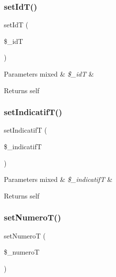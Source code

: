 \subsubsection{\texorpdfstring{set\+Id\+T()}{setIdT()}}
{\footnotesize\ttfamily set\+IdT (\begin{DoxyParamCaption}\item[{}]{\$\+\_\+idT }\end{DoxyParamCaption})}


\begin{DoxyParams}[1]{Parameters}
mixed & {\em \$\+\_\+idT} & \\
\hline
\end{DoxyParams}
\begin{DoxyReturn}{Returns}
self 
\end{DoxyReturn}
\mbox{\label{class_telephone_ab6bf8385aab0e358abde5765c80a934f}} 
\subsubsection{\texorpdfstring{set\+Indicatif\+T()}{setIndicatifT()}}
{\footnotesize\ttfamily set\+IndicatifT (\begin{DoxyParamCaption}\item[{}]{\$\+\_\+indicatifT }\end{DoxyParamCaption})}


\begin{DoxyParams}[1]{Parameters}
mixed & {\em \$\+\_\+indicatifT} & \\
\hline
\end{DoxyParams}
\begin{DoxyReturn}{Returns}
self 
\end{DoxyReturn}
\mbox{\label{class_telephone_a0e32ff398480ba0c68a1c25b8fb7e4a8}} 
\subsubsection{\texorpdfstring{set\+Numero\+T()}{setNumeroT()}}
{\footnotesize\ttfamily set\+NumeroT (\begin{DoxyParamCaption}\item[{}]{\$\+\_\+numeroT }\end{DoxyParamCaption})}


